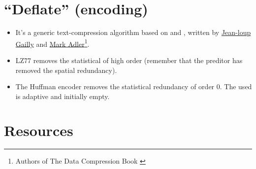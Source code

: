 \section{``Deflate'' (encoding)}
\begin{itemize}
\item It's a generic text-compression algorithm based on
   and ,
  written by
  \href{https://en.wikipedia.org/wiki/Jean-loup_Gailly}{Jean-loup
    Gailly} and \href{https://en.wikipedia.org/wiki/Mark_Adler}{Mark
    Adler}\footnote{Authors of The Data Compression Book
    \cite{nelson96datacompression}}.
\item LZ77 removes the statistical  of
  high order (remember that the preditor has removed the spatial
  redundancy).
\item The Huffman encoder removes the statistical redundancy of order
  0. The  used is
  adaptive and initially empty.
\end{itemize}

\begin{comment}
\section*{Let's go to the lab!}
\begin{itemize}
\item Fill-up the following table:
  \begin{tabular}{r|llll|l}
    \hline
    & \multicolumn{4}{c}{Image}     & \\
    \hline
    Codec & \href{http://www.hpca.ual.es/~vruiz/images/lena.png}{lena} & \href{http://www.hpca.ual.es/~vruiz/images/boats.png}{boats} & \href{http://www.hpca.ual.es/~vruiz/images/peppers.png}{pepers} & \href{http://www.hpca.ual.es/~vruiz/images/zelda.png}{zelda} & Average \href{https://en.wikipedia.org/wiki/Data_compression_ratio}{Compression Ratio} \\
    \hline
    \href{https://imagemagick.org/script/convert.php}{convert} & & & & & \\ 
    \hline
  \end{tabular}
\end{itemize}
\end{comment}

\section{Resources}

\renewcommand{\addcontentsline}[3]{}%

